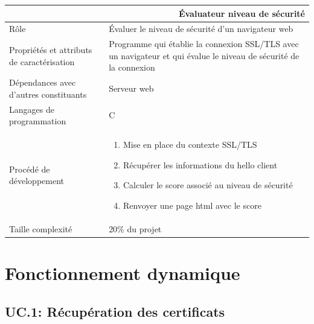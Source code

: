 \documentclass[a4paper,11pt,french]{article}
\begin{document}
\begin{center}
	\vspace*{0.7cm}
	\begin{tabularx}{16cm}{|l|X|}
	\hline
	\multicolumn{2}{|r|}{\textbf{Évaluateur niveau de sécurité}}\\
	\hline
	R\^ole & Évaluer le niveau de sécurité d'un navigateur web \\
	\hline
	Propriétés et attributs de caractérisation & Programme qui établie la connexion SSL/TLS avec un navigateur et qui évalue le niveau de sécurité de la connexion\\
	\hline
	Dépendances avec d'autres constituants & Serveur web \\
	\hline
	Langages de programmation & C\\
	\hline
	Procédé de développement & \begin{enumerate} \item Mise en place du contexte SSL/TLS \item Récupérer les informations du hello client \item Calculer le score associé au niveau de sécurité \item Renvoyer une page html avec le score \end{enumerate}\\
	\hline
	Taille complexité & 20\% du projet\\
	\hline
	\end{tabularx}
\end{center}

\newpage
\section{Fonctionnement dynamique}

\subsection{UC.1: Récupération des certificats}
\end{document}
